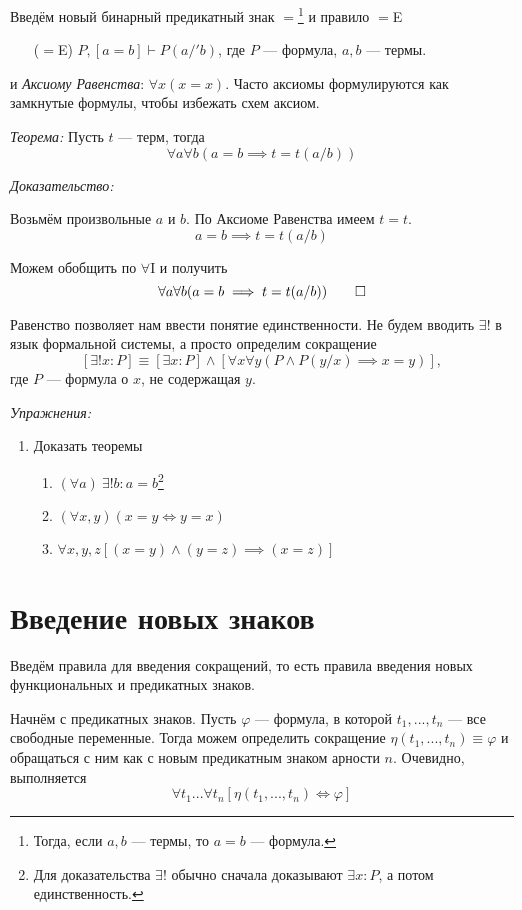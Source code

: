Введём новый бинарный предикатный знак $=$\footnote{
	Тогда, если $a,b$	 --- термы, то $a=b$ --- формула.
} и правило $=$E
\begin{enumerate}
	\item[($=$E)]{}$P,[a=b]\vdash P(a/'b)$,
	где $P$ --- формула, $a,b$ --- термы.
\end{enumerate}
и {\it Аксиому Равенства}: $\forall x(x=x)$.
Часто аксиомы формулируются как замкнутые формулы, чтобы избежать схем аксиом.

\vspace{1em}
{\it Теорема:} Пусть $t$ --- терм, тогда
\[
	\forall a\forall b(a=b\implies t=t(a/b))
\]

{\it Доказательство:}

Возьмём произвольные $a$ и $b$. По Аксиоме Равенства имеем $t=t$.
\[
	a=b\implies t=t(a/b)
\]

Можем обобщить по $\forall$I и получить
\[
	\forall a\forall b(a=b\implies t=t(a/b))
	\qed
\]

Равенство позволяет нам ввести понятие единственности.
Не будем вводить $\exists!$ в язык формальной системы, а просто определим сокращение
\[
	[\exists! x:P]\equiv[\exists x:P]\land[\forall x\forall y(P\land P(y/x)\implies x=y)],
\]
где $P$ --- формула о $x$, не содержащая $y$.

\vspace{1em}
{\it Упражнения:}
\begin{enumerate}
	\item{}Доказать теоремы
	\begin{enumerate}
		\item{}$(\forall a)~\exists! b:a=b$\footnote{
			Для доказательства $\exists!$ обычно сначала
			доказывают ${\exists x:P}$, а потом единственность.
		}
		\item{}$(\forall x,y)(x=y\iff y=x)$
		\item{}$\forall x,y,z[(x=y)\land (y=z)\implies (x=z)]$
	\end{enumerate}
\end{enumerate}

\section{Введение новых знаков}

Введём правила для введения сокращений, то есть правила введения новых функциональных
и предикатных знаков.

Начнём с предикатных знаков. Пусть $\varphi$ --- формула, в которой $t_1,...,t_{n}$ --- все
свободные переменные. Тогда можем определить сокращение $\eta(t_1,...,t_{n})\equiv\varphi$
и обращаться с ним как с новым предикатным знаком арности $n$.
Очевидно, выполняется
\[
	\forall t_1...\forall t_{n}[\eta(t_1,...,t_{n})\iff\varphi]
\]

